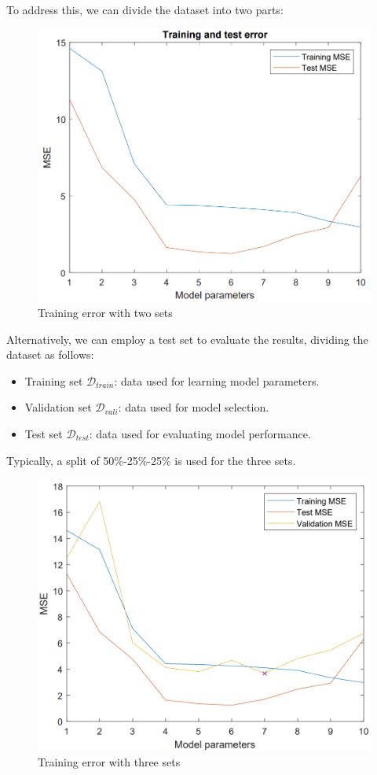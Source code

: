To address this, we can divide the dataset into two parts:
\begin{figure}[H]
    \centering
    \includegraphics[width=0.5\linewidth]{images/err1.png}
    \caption{Training error with two sets}
\end{figure}
Alternatively, we can employ a test set to evaluate the results, dividing the dataset as follows:
\begin{itemize}
    \item Training set $\mathcal{D}_{train}$: data used for learning model parameters.
    \item Validation set $\mathcal{D}_{vali}$: data used for model selection.
    \item Test set $\mathcal{D}_{test}$: data used for evaluating model performance.
\end{itemize}
Typically, a split of 50\%-25\%-25\% is used for the three sets.
\begin{figure}[H]
    \centering
    \includegraphics[width=0.5\linewidth]{images/err2.png}
    \caption{Training error with three sets}
\end{figure}